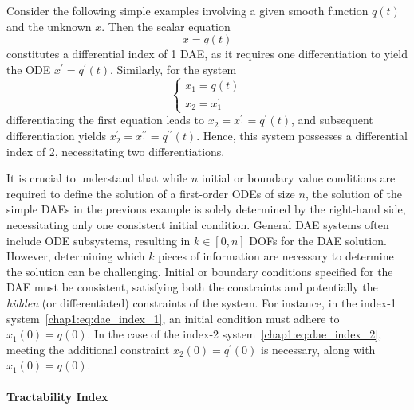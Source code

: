 \begin{example}
  Consider the following simple examples involving a given smooth function $q(t)$ and the unknown $x$. Then the scalar equation
  \begin{equation}
    x = q(t)
    \label{chap1:eq:dae_index_1}
  \end{equation}
  constitutes a differential index of 1 \ac{DAE}, as it requires one differentiation to yield the \ac{ODE} $x^{\prime} = q^{\prime}(t)$. Similarly, for the system
  \begin{equation}
    \begin{cases}
      x_1 = q(t) \\
      x_2 = x_1^{\prime}
    \end{cases}
    \label{chap1:eq:dae_index_2}
  \end{equation}
  differentiating the first equation leads to $x_2 = x_1^{\prime} = q^{\prime}(t)$, and subsequent differentiation yields $x_2^{\prime} = x_1^{\prime\prime} = q^{\prime\prime}(t)$. Hence, this system possesses a differential index of 2, necessitating two differentiations.
\end{example}

It is crucial to understand that while $n$ initial or boundary value conditions are required to define the solution of a first-order \acp{ODE} of size $n$, the solution of the simple \acp{DAE} in the previous example is solely determined by the right-hand side, necessitating only one consistent initial condition. General \ac{DAE} systems often include \ac{ODE} subsystems, resulting in $k \in [0, n]$ \acp{DOF} for the \ac{DAE} solution. However, determining which $k$ pieces of information are necessary to determine the solution can be challenging. Initial or boundary conditions specified for the \ac{DAE} must be consistent, satisfying both the constraints and potentially the \emph{hidden} (or differentiated) constraints of the system. For instance, in the index-1 system~\eqref{chap1:eq:dae_index_1}, an initial condition must adhere to $x_1(0) = q(0)$. In the case of the index-2 system~\eqref{chap1:eq:dae_index_2}, meeting the additional constraint $x_2(0) = q^{\prime}(0)$ is necessary, along with $x_1(0) = q(0)$.

\paragraph{Tractability Index}

